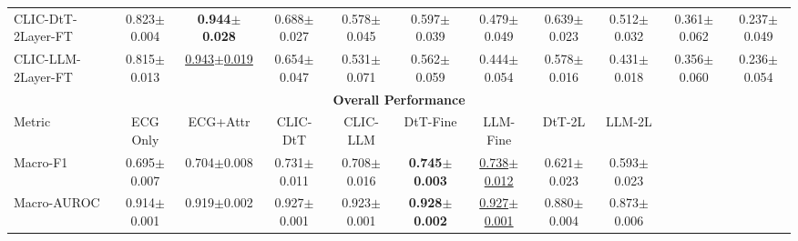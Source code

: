\begin{table}[!h]
{\begin{tabular}{lcccccccccc}
CLIC-DtT-2Layer-FT &
0.823$\pm$0.004 & \textbf{0.944$\pm$0.028} &
0.688$\pm$0.027 & 0.578$\pm$0.045 &
0.597$\pm$0.039 & 0.479$\pm$0.049 &
0.639$\pm$0.023 & 0.512$\pm$0.032 &
0.361$\pm$0.062 & 0.237$\pm$0.049 \\

CLIC-LLM-2Layer-FT &
0.815$\pm$0.013 & \underline{0.943$\pm$0.019} &
0.654$\pm$0.047 & 0.531$\pm$0.071 &
0.562$\pm$0.059 & 0.444$\pm$0.054 &
0.578$\pm$0.016 & 0.431$\pm$0.018 &
0.356$\pm$0.060 & 0.236$\pm$0.054 \\

\midrule
\multicolumn{11}{c}{\textbf{Overall Performance}} \\
\midrule

\multicolumn{1}{l}{Metric}
& \multicolumn{1}{c}{\scriptsize ECG Only}
& \multicolumn{1}{c}{\scriptsize ECG+Attr}
& \multicolumn{1}{c}{\scriptsize CLIC-DtT}
& \multicolumn{1}{c}{\scriptsize CLIC-LLM}
& \multicolumn{1}{c}{\scriptsize DtT-Fine}
& \multicolumn{1}{c}{\scriptsize LLM-Fine}
& \multicolumn{1}{c}{\scriptsize DtT-2L}
& \multicolumn{1}{c}{\scriptsize LLM-2L}
& \multicolumn{1}{c}{}
& \multicolumn{1}{c}{} \\
\cmidrule(lr){1-1} \cmidrule(lr){2-9}

Macro-F1 &
0.695$\pm$0.007 &
0.704$\pm$0.008 &
0.731$\pm$0.011 &
0.708$\pm$0.016 &
\textbf{0.745$\pm$0.003} &
\underline{0.738$\pm$0.012} &
0.621$\pm$0.023 &
0.593$\pm$0.023 &
&\\

Macro-AUROC &
0.914$\pm$0.001 &
0.919$\pm$0.002 &
0.927$\pm$0.001 &
0.923$\pm$0.001 &
\textbf{0.928$\pm$0.002} &
\underline{0.927$\pm$0.001} &
0.880$\pm$0.004 &
0.873$\pm$0.006 &
&\\

\bottomrule
\end{tabular}
}
\end{table}
